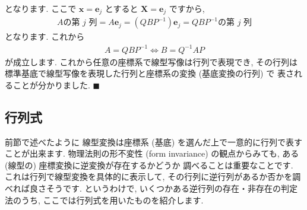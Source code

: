 \documentclass[openany, a4paper, oneside]{jsbook}
\theoremstyle{break}
\theoremstyle{breakdefn}
\begin{document}
となります.
ここで $\bm{x} = \bm{e}_j$ とすると $\bm{X} = \bm{e}_j$ ですから,
    \begin{gather}
        A\text{の第 $j$ 列}
        =
        A \bm{e}_j
        =
        ( Q B P^{-1} ) \bm{e}_j
        =
        Q B P^{-1} \text{の第 $j$ 列}
    \end{gather}
となります.
これから
    \begin{gather}
        A
        =
        Q B P^{-1}
        \Longleftrightarrow
        B
        =
        Q^{-1} A P
    \label{eq:基底変換}
    \end{gather}
が成立します.
これから任意の座標系で線型写像は行列で表現でき,
その行列は標準基底で線型写像を表現した行列と座標系の変換 (基底変換の行列) で
表されることが分かりました.  $\blacksquare$
\subsection{行列式}


前節で述べたように
線型変換は座標系 (基底) を選んだ上で一意的に行列で表すことが出来ます.
物理法則の形不変性 (form invariance) の観点からみても, ある (線型の) 座標変換に逆変換が存在するかどうか
調べることは重要なことです.
これは行列で線型変換を具体的に表示して, その行列に逆行列があるか否かを調べれば良さそうです.
というわけで, いくつかある逆行列の存在・非存在の判定法のうち, ここでは行列式を用いたものを紹介します.
\end{document}
